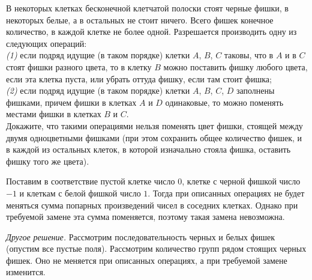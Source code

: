 \problem
В некоторых клетках бесконечной клетчатой полоски стоят черные фишки, в
некоторых белые, а в остальных не стоит ничего.
Всего фишек конечное количество, в каждой клетке не более одной.
Разрешается производить одну из следующих операций:
\\\emph{(1)}
если подряд идущие (в таком порядке) клетки $A$, $B$, $C$ таковы, что в $A$ и в
$C$ стоят фишки разного цвета, то в клетку $B$ можно поставить фишку любого
цвета, если эта клетка пуста, или убрать оттуда фишку, если там стоит фишка;
\\\emph{(2)}
если подряд идущие (в таком порядке) клетки $A$, $B$, $C$, $D$ заполнены
фишками, причем фишки в клетках $A$ и $D$ одинаковые, то можно поменять местами
фишки в клетках $B$ и $C$.
\\Докажите, что такими операциями нельзя поменять цвет фишки, стоящей между
двумя одноцветными фишками
(при этом сохранить общее количество фишек, и в каждой из остальных клеток, в
которой изначально стояла фишка, оставить фишку того же цвета).

\solution
Поставим в соответствие пустой клетке число $0$, клетке с черной фишкой число
$-1$ и клеткам с белой фишкой число $1$.
Тогда при описанных операциях не будет меняться сумма попарных произведений
чисел в соседних клетках.
Однако при требуемой замене эта сумма поменяется, поэтому такая замена
невозможна.
\par
\emph{Другое решение.}
Рассмотрим последовательность черных и белых фишек (опустим все пустые поля).
Рассмотрим количество групп рядом стоящих черных фишек.
Оно не меняется при описанных операциях, а при требуемой замене изменится.

\endproblem
